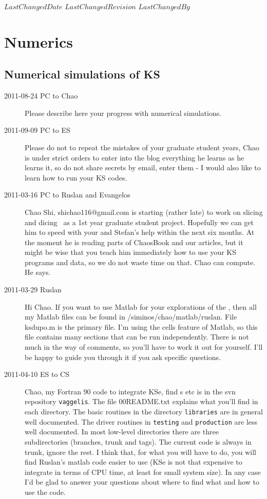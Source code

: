 \ifsvnmulti
{}
{$LastChangedDate$}
{$LastChangedRevision$} {$LastChangedBy$}
\fi


\chapter{Numerics}
\label{chap:numerics}


\section{Numerical simulations of KS}
\label{s:KSnumerical}

\begin{description}

\item[2011-08-24 PC to Chao]
Please describe here your progress with numerical simulations.

\item[2011-09-09 PC to ES]
Please do not to repeat the mistakes of your graduate student years, Chao
is under strict orders to enter into the blog everything he learns as he
learns it, so do not share secrets by email, enter them - I would also
like to learn how to run your KS codes.

\item[2011-03-16 PC to Ruslan and Evangelos]
   Chao Shi, shichao116@gmail.com is starting (rather late) to work on
   slicing and dicing \KS\ as a 1st year graduate student
   project. Hopefully we can get him to speed with your and Stefan's help
   within the next six months. At the moment he is reading parts of
   ChaosBook and our articles, but it might be wise that you teach him
   immediately how to use your KS programs and data, so we do not waste
   time on that. Chao can compute. He says.

\item[2011-03-29 Ruslan]
Hi Chao.  If you want to use Matlab for your explorations of the \KS,
then all my Matlab files can be found in /siminos/chao/matlab/ruslan.
File ksdupo.m is the primary file.  I'm using the cells feature of
Matlab, so this file contains many sections that can be run
independently.  There is not much in the way of comments, so you'll have
to work it out for yourself.  I'll be happy to guide you through it if
you ask specific questions.

\item[2011-04-10 ES to CS] Chao, my Fortran 90 code to integrate KSe, find
\po s etc is in the svn repository \texttt{vaggelis}. The file 00README.txt
explains what you'll find in each directory. The basic routines in the
directory \texttt{libraries} are in general well documented. The driver routines in
\texttt{testing} and \texttt{production} are less well documented. In most
low-level directories there are three subdirectories (branches, trunk and tags).
The current code is always in trunk, ignore the rest. I think that, for what you
will have to do, you will find Ruslan's matlab code easier to use (KSe is not that
expensive to integrate in terms of CPU time, at least for small system size). In any
case I'd be glad to answer your questions about where to find what and how to
use the code.


\end{description}

